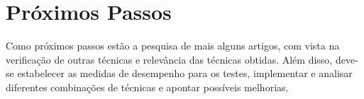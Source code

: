 \documentclass[
	12pt,				%
	openright,			%
	oneside,			%
	a4paper,			%
	english,			%
	brazil,				%
	]{abntex2}
\begin{document}
\chapter[Próximos Passos]{Próximos Passos}
Como próximos passos estão a pesquisa de mais alguns artigos, com vista na verificação de outras técnicas e relevância das técnicas obtidas. Além disso, deve-se estabelecer as medidas de desempenho para os testes, implementar e analisar diferentes combinações de técnicas e apontar possíveis melhorias.



%




\end{document}

